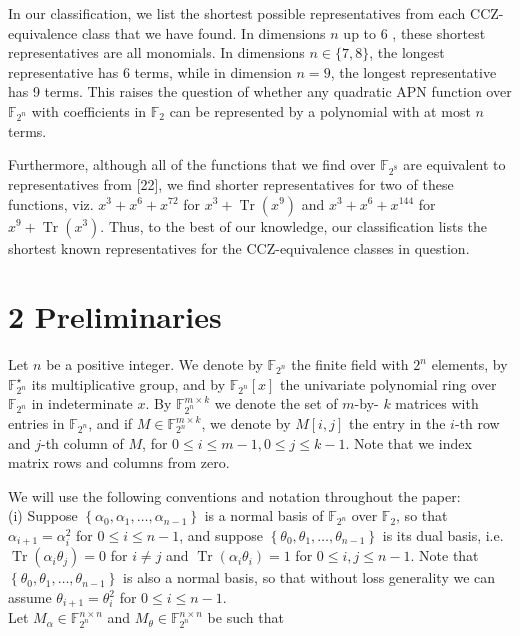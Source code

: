 \documentclass[10pt]{article}
\begin{document}
In our classification, we list the shortest possible representatives from each CCZ-equivalence class that we have found. In dimensions $n$ up to 6 , these shortest representatives are all monomials. In dimensions $n \in\{7,8\}$, the longest representative has 6 terms, while in dimension $n=9$, the longest representative has 9 terms. This raises the question of whether any quadratic APN function over $\mathbb{F}_{2^{n}}$ with coefficients in $\mathbb{F}_{2}$ can be represented by a polynomial with at most $n$ terms.

Furthermore, although all of the functions that we find over $\mathbb{F}_{2^{8}}$ are equivalent to representatives from [22], we find shorter representatives for two of these functions, viz. $x^{3}+x^{6}+x^{72}$ for $x^{3}+\operatorname{Tr}\left(x^{9}\right)$ and $x^{3}+x^{6}+x^{144}$ for $x^{9}+\operatorname{Tr}\left(x^{3}\right)$. Thus, to the best of our knowledge, our classification lists the shortest known representatives for the CCZ-equivalence classes in question.

\section*{2 Preliminaries}
Let $n$ be a positive integer. We denote by $\mathbb{F}_{2^{n}}$ the finite field with $2^{n}$ elements, by $\mathbb{F}_{2^{n}}^{\star}$ its multiplicative group, and by $\mathbb{F}_{2^{n}}[x]$ the univariate polynomial ring over $\mathbb{F}_{2^{n}}$ in indeterminate $x$. By $\mathbb{F}_{2^{n}}^{m \times k}$ we denote the set of $m$-by- $k$ matrices with entries in $\mathbb{F}_{2^{n}}$, and if $M \in \mathbb{F}_{2^{n}}^{m \times k}$, we denote by $M[i, j]$ the entry in the $i$-th row and $j$-th column of $M$, for $0 \leq i \leq m-1,0 \leq j \leq k-1$. Note that we index matrix rows and columns from zero.

We will use the following conventions and notation throughout the paper:\\
(i) Suppose $\left\{\alpha_{0}, \alpha_{1}, \ldots, \alpha_{n-1}\right\}$ is a normal basis of $\mathbb{F}_{2^{n}}$ over $\mathbb{F}_{2}$, so that $\alpha_{i+1}= \alpha_{i}^{2}$ for $0 \leq i \leq n-1$, and suppose $\left\{\theta_{0}, \theta_{1}, \ldots, \theta_{n-1}\right\}$ is its dual basis, i.e. $\operatorname{Tr}\left(\alpha_{i} \theta_{j}\right)=0$ for $i \neq j$ and $\operatorname{Tr}\left(\alpha_{i} \theta_{i}\right)=1$ for $0 \leq i, j \leq n-1$. Note that $\left\{\theta_{0}, \theta_{1}, \ldots, \theta_{n-1}\right\}$ is also a normal basis, so that without loss generality we can assume $\theta_{i+1}=\theta_{i}^{2}$ for $0 \leq i \leq n-1$.\\
Let $M_{\alpha} \in \mathbb{F}_{2^{n}}^{n \times n}$ and $M_{\theta} \in \mathbb{F}_{2^{n}}^{n \times n}$ be such that
\end{document}
